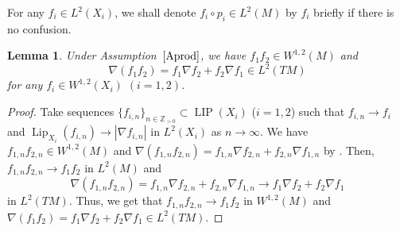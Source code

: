 \documentclass[10pt,a4paper]{amsart}
\numberwithin{equation}{section}
\newtheorem{Lem}[Thm]{Lemma}
\theoremstyle{definition}
\newcommand{\LIP}{\operatorname{LIP}}
\newcommand{\Lip}{\operatorname{Lip}}
\newcommand{\Z}{\mathbb{Z}}
\begin{document}
For any $f_i\in L^2(X_i)$, we shall denote $f_i\circ p_i\in L^2(M)$ by $f_i$ briefly if there is no confusion.
\begin{Lem}\label{sbprod}
Under Assumption~$\ref{Aprod}$, we have $f_1 f_2\in W^{1,2}(M)$ and
\[
\nabla (f_1 f_2)=f_1 \nabla f_2+f_2 \nabla f_1\in L^2(T M)
\]
for any $f_i\in W^{1,2}(X_i)$ $(i=1,2)$.
\end{Lem}
\begin{proof}
Take sequences $\{f_{i,n}\}_{n\in \Z_{>0}}\subset \LIP(X_i)$ ($i=1,2$) such that
$f_{i,n}\to f_i$ and $\Lip_{X_i}(f_{i,n})\to |\nabla f_{i,n}|$ in $L^2(X_i)$ as $n\to \infty$.
We have $f_{1,n} f_{2,n}\in W^{1,2}(M)$ and $\nabla (f_{1,n} f_{2,n})=f_{1,n}\nabla f_{2,n} +f_{2,n}\nabla f_{1,n}$ by \cite[Theorem~2.2.6]{Gig}.
Then, $f_{1,n} f_{2,n}\to f_1 f_2$ in $L^2(M)$ and
\[
\nabla (f_{1,n} f_{2,n})=f_{1,n}\nabla f_{2,n} +f_{2,n}\nabla f_{1,n}\to f_1\nabla f_2+f_2\nabla f_1\]
in $L^2(T M)$.
Thus, we get that $f_{1,n} f_{2,n}\to f_1 f_2$ in $W^{1,2}(M)$ and
$\nabla (f_1 f_2)=f_1 \nabla f_2+f_2 \nabla f_1\in L^2(T M)$.
\end{proof}
\end{document}
